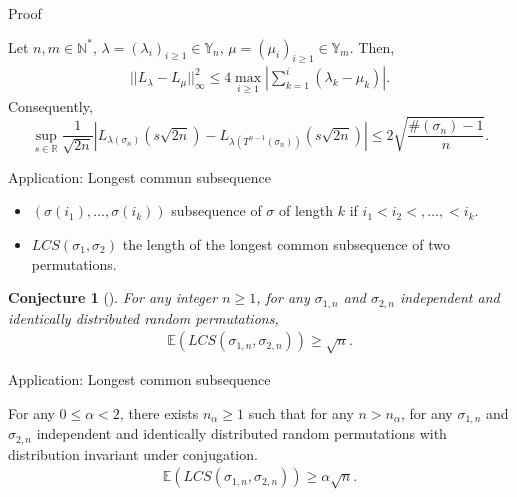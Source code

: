 \documentclass[english,xcolor=table]{beamer}
\newtheorem{conjecture}[theorem]{Conjecture}
\begin{document}
\begin{frame}{Proof}

\begin{lemma} \label{34}
Let $n,m\in \mathbb{N}^*$, $\lambda=(\lambda_i)_{i\geq1}\in\mathbb{Y}_n$, $\mu=(\mu_i)_{i\geq1}\in\mathbb{Y}_m$. Then,
\begin{align*}\label{disVC}
||L_\lambda-L_\mu||_{\infty}^2 \leq 4 \max_{i\geq 1} \left|\sum_{k=1}^i( \lambda_k-\mu_k)\right|.
\end{align*}
Consequently, 
\begin{equation*}
\sup_{s\in \mathbb{R}} \frac{1}{\sqrt{2n}}\left|L_{\lambda(\sigma_n)}\left({s}{\sqrt{2n}}\right)- L_{\lambda(T^{n-1}(\sigma_n))}\left({s}{\sqrt{2n}}\right)\right| \leq 2 \sqrt{\frac{\#(\sigma_n)-1}{n}}.
\end{equation*}
\end{lemma}
\end{frame}
\begin{frame}{Application: Longest commun subsequence}
\begin{itemize}
\item $(\sigma(i_1),\dots,\sigma(i_k))$ subsequence of $\sigma$ of length $k$ if $ i_1<i_2<,\dots,<i_k$.
\item $LCS(\sigma_1,\sigma_2)$ the length of the longest common subsequence of two permutations.
\end{itemize}

\begin{conjecture}[\cite{MR3509473}]
 For any integer $n\geq 1$,  for any $\sigma_{1,n}$ and $\sigma_{2,n}$   independent and identically distributed  random permutations,
\begin{align*}
    \mathbb{E}(LCS(\sigma_{1,n},\sigma_{2,n}))\geq \sqrt{n}.
\end{align*}
\end{conjecture}
\end{frame}
\begin{frame}{Application: Longest common subsequence}


\begin{theorem}\label{thmp}
For any $0\leq \alpha<2$, there exists $n_\alpha\geq 1$ such that for any $n>n_\alpha$, for any $\sigma_{1,n}$ and $\sigma_{2,n}$   independent and identically distributed  random permutations with distribution invariant under conjugation.
\begin{align*}
    \mathbb{E}(LCS(\sigma_{1,n},\sigma_{2,n}))\geq \alpha\sqrt{n}.
\end{align*}
\end{theorem}

  
\end{frame}
\end{document}
